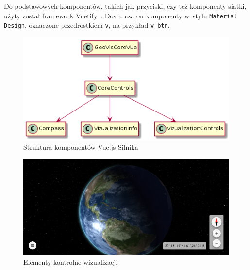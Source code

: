 Do podstawowych komponentów, takich jak przyciski, czy też komponenty siatki, użyty został framework Vuetify~\cite{Vuetify}. Dostarcza on komponenty w~stylu \texttt{Material Design}, oznaczone przedrostkiem \texttt{v}, na przykład \texttt{v-btn}.

\begin{figure}[h]
    \centering
    \includegraphics[scale=0.6]{diagrams/out/c3_vue.png}
    \caption{Struktura komponentów Vue.js Silnika}
    \label{fig:c3_vue}
\end{figure}

\begin{figure}
    \centering
    \includegraphics[width=\linewidth]{img/c3_controls.png}
    \caption{Elementy kontrolne wizualizacji}
    \label{fig:c3_controls}
\end{figure}


